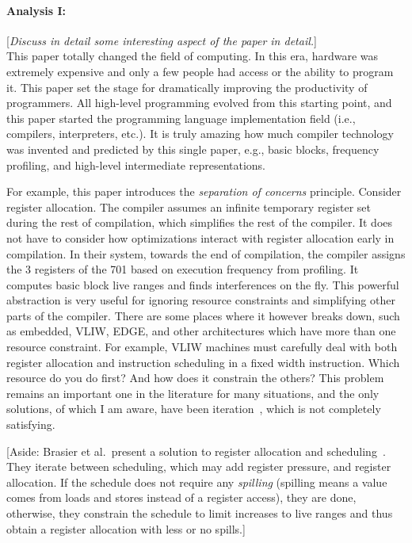 \documentclass[12pt]{article}
\begin{document}
\paragraph{Analysis I:} [\emph{Discuss in detail some interesting aspect of the
paper in detail.}] \\
This paper totally changed the field of computing.  In this era, hardware was
extremely expensive and only a few people had access or the ability to program
it.  This paper set the stage for dramatically improving the productivity of
programmers.  All high-level programming evolved from this starting point, and
this paper started the programming language implementation field (i.e.,
compilers, interpreters, etc.).  It is truly amazing how much compiler
technology was invented and predicted by this single paper, e.g., basic
blocks, frequency profiling, and high-level intermediate representations.

For example, this paper introduces the \emph{separation of concerns}
principle. Consider register allocation. The compiler assumes an infinite
temporary register set during the rest of compilation, which simplifies the
rest of the compiler.  It does not have to consider how optimizations interact
with register allocation early in compilation.  In their system, towards the
end of compilation, the compiler assigns the 3 registers of the 701 based on
execution frequency from profiling.  It computes basic block live ranges and
finds interferences on the fly.  This powerful abstraction is very useful for
ignoring resource constraints and simplifying other parts of the compiler.
There are some places where it however breaks down, such as embedded, VLIW,
EDGE, and other architectures which have more than one resource constraint.
For example, VLIW machines must carefully deal with both register allocation
and instruction scheduling in a fixed width instruction.  Which resource do
you do first? And how does it constrain the others?  This problem remains an
important one in the literature for many situations, and the only solutions,
of which I am aware, have been iteration~\cite{CRAIG, maher}, which is not
completely satisfying.

[Aside: Brasier et al.\ present a solution to register allocation and
scheduling~\cite{CRAIG}.  They iterate between scheduling, which may add
register pressure, and register allocation.  If the schedule does not require
any \emph{spilling} (spilling means a value comes from loads and stores
instead of a register access), they are done, otherwise, they constrain the
schedule to limit increases to live ranges and thus obtain a register
allocation with less or no spills.]
\end{document}
